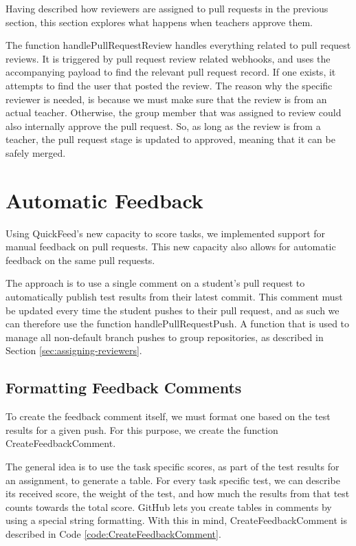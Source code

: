 Having described how reviewers are assigned to pull requests in the previous section, this section explores what happens when teachers approve them.

The function handlePullRequestReview handles everything related to pull request reviews.
It is triggered by pull request review related webhooks, and uses the accompanying payload to find the relevant pull request record.
If one exists, it attempts to find the user that posted the review.
The reason why the specific reviewer is needed, is because we must make sure that the review is from an actual teacher.
Otherwise, the group member that was assigned to review could also internally approve the pull request.
So, as long as the review is from a teacher, the pull request stage is updated to approved, meaning that it can be safely merged.

\section{Automatic Feedback}

Using QuickFeed's new capacity to score tasks, we implemented support for manual feedback on pull requests.
This new capacity also allows for automatic feedback on the same pull requests.

The approach is to use a single comment on a student's pull request to automatically publish test results from their latest commit.
This comment must be updated every time the student pushes to their pull request, and as such we can therefore use the function handlePullRequestPush.
A function that is used to manage all non-default branch pushes to group repositories, as described in Section \ref{sec:assigning-reviewers}.

\subsection{Formatting Feedback Comments}

To create the feedback comment itself, we must format one based on the test results for a given push.
For this purpose, we create the function CreateFeedbackComment.

The general idea is to use the task specific scores, as part of the test results for an assignment, to generate a table.
For every task specific test, we can describe its received score, the weight of the test, and how much the results from that test counts towards the total score.
GitHub lets you create tables in comments by using a special string formatting.
With this in mind, CreateFeedbackComment is described in Code \ref{code:CreateFeedbackComment}.

